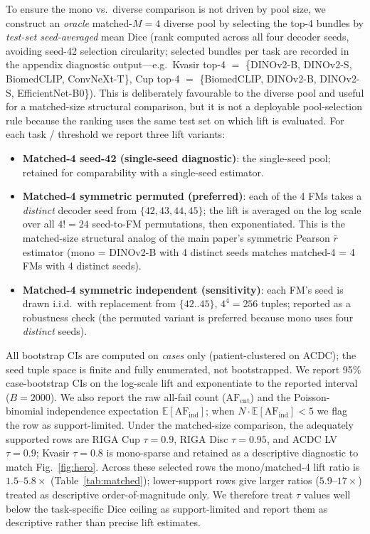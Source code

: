 To ensure the mono vs.\ diverse comparison is not driven by pool size, we construct an \emph{oracle} matched-$M{=}4$ diverse pool by selecting the top-4 bundles by \emph{test-set seed-averaged} mean Dice (rank computed across all four decoder seeds, avoiding seed-42 selection circularity; selected bundles per task are recorded in the appendix diagnostic output---e.g.\ Kvasir top-4 $=$ \{DINOv2-B, DINOv2-S, BiomedCLIP, ConvNeXt-T\}, Cup top-4 $=$ \{BiomedCLIP, DINOv2-B, DINOv2-S, EfficientNet-B0\}). This is deliberately favourable to the diverse pool and useful for a matched-size structural comparison, but it is not a deployable pool-selection rule because the ranking uses the same test set on which lift is evaluated. For each task / threshold we report three lift variants:

\begin{itemize}[leftmargin=2em,itemsep=0pt,topsep=2pt]
\item \textbf{Matched-4 seed-42 (single-seed diagnostic)}: the single-seed pool; retained for comparability with a single-seed estimator.
\item \textbf{Matched-4 symmetric permuted (preferred)}: each of the 4 FMs takes a \emph{distinct} decoder seed from $\{42,43,44,45\}$; the lift is averaged on the log scale over all $4!=24$ seed-to-FM permutations, then exponentiated. This is the matched-size structural analog of the main paper's symmetric Pearson $\bar{r}$ estimator (mono = DINOv2-B with 4 distinct seeds matches matched-4 = 4 FMs with 4 distinct seeds).
\item \textbf{Matched-4 symmetric independent (sensitivity)}: each FM's seed is drawn i.i.d.\ with replacement from $\{42..45\}$, $4^4=256$ tuples; reported as a robustness check (the permuted variant is preferred because mono uses four \emph{distinct} seeds).
\end{itemize}
All bootstrap CIs are computed on \emph{cases} only (patient-clustered on ACDC); the seed tuple space is finite and fully enumerated, not bootstrapped. We report 95\% case-bootstrap CIs on the log-scale lift and exponentiate to the reported interval ($B{=}2000$). We also report the raw all-fail count ($\mathrm{AF}_{\mathrm{cnt}}$) and the Poisson-binomial independence expectation $\mathbb{E}[\mathrm{AF}_{\mathrm{ind}}]$; when $N\cdot\mathbb{E}[\mathrm{AF}_{\mathrm{ind}}]<5$ we flag the row as support-limited. Under the matched-size comparison, the adequately supported rows are RIGA Cup $\tau{=}0.9$, RIGA Disc $\tau{=}0.95$, and ACDC LV $\tau{=}0.9$; Kvasir $\tau{=}0.8$ is mono-sparse and retained as a descriptive diagnostic to match Fig.~\ref{fig:hero}. Across these selected rows the mono/matched-4 lift ratio is $1.5$--$5.8\times$ (Table~\ref{tab:matched}); lower-support rows give larger ratios ($5.9$--$17\times$) treated as descriptive order-of-magnitude only. We therefore treat $\tau$ values well below the task-specific Dice ceiling as support-limited and report them as descriptive rather than precise lift estimates.


